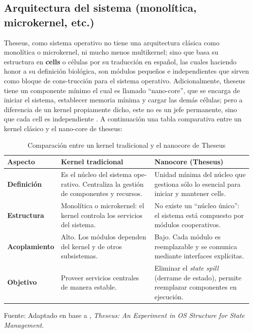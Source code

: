 \subsection{Arquitectura del sistema (monolítica, microkernel, etc.)}
Theseus, como sistema operativo no tiene una arquitectura clásica como monolítica o microkernel, ni mucho menos multikernel; sino que basa su estructura en \textbf{cells} o células por su traducción en español, las cuales haciendo honor a su definición biológica, son módulos pequeños e independientes que sirven como bloque de cons-trucción para el sistema operativo. Adicionalmente, theseus tiene un componente mínimo el cual es llamado ``nano-core'', que se encarga de iniciar el sistema, establecer memoria mínima y cargar las demás células; pero a diferencia de un kernel propiamente dicho, este no es un jefe permanente, sino que cada cell es independiente \citep{boos2020theseus}. A continuación una tabla comparativa entre un kernel clásico y el nano-core de theseus:
\begin{table}[H]
\centering
\caption{Comparación entre un kernel tradicional y el nanocore de Theseus}
\label{tab:nanocore_vs_kernel}
\begin{tabular}{|p{3cm}|p{5.5cm}|p{5.5cm}|}
\hline
\textbf{Aspecto} & \textbf{Kernel tradicional} & \textbf{Nanocore (Theseus)} \\ \hline
\textbf{Definición} &
Es el núcleo del sistema ope-rativo. Centraliza la gestión de componentes y recursos. &
Unidad mínima del núcleo que gestiona sólo lo esencial para iniciar y mantener cells. \\ \hline
\textbf{Estructura} &
Monolítica o microkernel: el kernel controla los servicios del sistema. &
No existe un ``núcleo único'': el sistema está compuesto por módulos cooperativos. \\ \hline
\textbf{Acoplamiento} &
Alto. Los módulos dependen del kernel y de otros subsistemas. &
Bajo. Cada módulo es reemplazable y se comunica mediante interfaces explícitas. \\ \hline
\textbf{Objetivo} &
Proveer servicios centrales de manera estable. &
Eliminar el \textit{state spill} (derrame de estado), permite reemplazar componentes en ejecución. \\ \hline
\end{tabular}
\centering
\small Fuente: Adaptado en base a \citep{boos2020theseus}, \textit{Theseus: An Experiment in OS Structure for State Management}.
\end{table}


